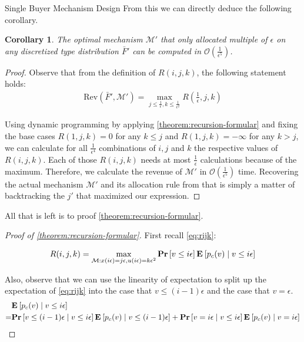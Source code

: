 \documentclass[11pt,a4paper]{article}
\newtheorem{corollary}[theorem]{Corollary}
\renewcommand{\Pr}[1]{\mbox{\rm\bf Pr}\left[#1\right]}
\newcommand{\Ex}[2][]{\mbox{\rm\bf E}_{#1}\left[#2\right]}
\newcommand{\1}[1]{\mbox{\rm\bf 1}_{#1}}
\begin{document}
\begin{section}{Single Buyer Mechanism Design}
 From this we can directly deduce the following corollary.

 \begin{corollary}
     The optimal mechanism $\mathcal{M}'$ that only allocated multiple of $\epsilon$ on any discretized type distribution $\bar{F}'$
     can be computed in $\mathcal{O}\left(\frac{1}{\epsilon^5}\right)$.
 \end{corollary}
 \begin{proof}
     Observe that from the definition of $R(i,j,k)$, the following statement holds:
     \begin{align*}
         \mathrm{Rev}(\bar{F}', \mathcal{M}') = \max_{j \leq \frac{1}{\epsilon}, k \leq \frac{1}{\epsilon^2}} R\left(\frac{1}{\epsilon}, j, k\right)
     \end{align*}

     Using dynamic programming by applying \autoref{theorem:recursion-formular} and fixing the base cases $R(1,j,k) = 0$ for any $k \leq j$ and $R(1,j,k)=-\infty$ for any $k > j$,
     we can calculate for all $\frac{1}{\epsilon^4}$ combinations of $i,j$ and $k$ the respective values of $R(i,j,k)$.
     Each of those $R(i,j,k)$ needs at most $\frac{1}{\epsilon}$ calculations because of the maximum.
     Therefore, we calculate the revenue of $\mathcal{M}'$ in $\mathcal{O}\left(\frac{1}{\epsilon^5}\right)$ time.
     Recovering the actual mechanism $\mathcal{M}'$ and its allocation rule from that is simply a matter of backtracking the $j'$ that maximized our expression.
 \end{proof}

 All that is left is to proof \autoref{theorem:recursion-formular}.
 \begin{proof}[Proof of \autoref{theorem:recursion-formular}]
     First recall \autoref{eq:rijk}:

     \begin{align*}
         R(i,j,k) = \max_{\mathcal{M}: x(i\epsilon) = j\epsilon, u(i\epsilon) = k \epsilon^2} \Pr{v \leq i\epsilon}\Ex{p_c(v)\mid v \leq i \epsilon}
     \end{align*}

     Also, observe that we can use the linearity of expectation to split up the expectation of \autoref{eq:rijk} into the case that $v \leq (i-1)\epsilon$ and the case that $v = \epsilon$.
     \begin{align*}
           & \Ex{p_c(v)\mid v \leq i \epsilon}                                                                                                                                      \\
         = & \Pr{v \leq (i-1)\epsilon \mid v \leq i \epsilon} \Ex{p_c(v) \mid v \leq (i - 1) \epsilon} + \Pr{v = i \epsilon \mid v \leq i \epsilon} \Ex{p_c(v) \mid v = i \epsilon} \\
     \end{align*}


\end{proof}
\end{section}
\end{document}
